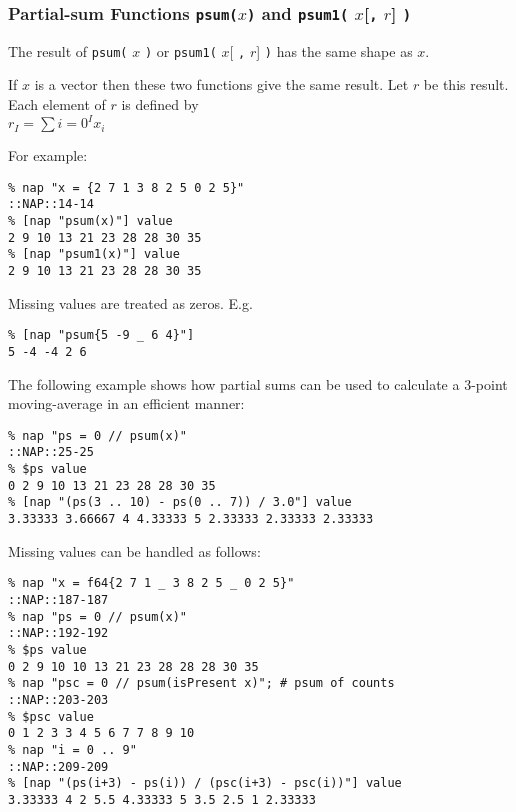   \subsubsection{
    \label{psum}Partial-sum Functions \texttt{psum(}$x$\texttt{)} and \texttt{psum1(} $x$[\texttt{,} $r$] \texttt{)}
  }
The result of 
  \texttt{psum(} 
  $x$ 
  \texttt{)} or 
  \texttt{psum1(} 
  $x$[
  \texttt{,} 
  $r$] 
  \texttt{)} has the same shape as 
  $x$.
  \par If 
  $x$ is a vector then these two functions give the same
  result. Let 
  $r$ be this result. Each element of 
  $r$ is defined by
  \\
  $r_I = \sum{i=0}^I x_i$
    \\
  \par For example:
  \begin{verbatim}
% nap "x = {2 7 1 3 8 2 5 0 2 5}"
::NAP::14-14
% [nap "psum(x)"] value
2 9 10 13 21 23 28 28 30 35
% [nap "psum1(x)"] value
2 9 10 13 21 23 28 28 30 35
\end{verbatim}

  \par Missing values are treated as zeros. E.g.
  \begin{verbatim}
% [nap "psum{5 -9 _ 6 4}"]
5 -4 -4 2 6
\end{verbatim}

  \par The following example shows how partial sums can be used to
  calculate a 3-point moving-average in an efficient manner:
  \begin{verbatim}
% nap "ps = 0 // psum(x)"
::NAP::25-25
% $ps value
0 2 9 10 13 21 23 28 28 30 35
% [nap "(ps(3 .. 10) - ps(0 .. 7)) / 3.0"] value
3.33333 3.66667 4 4.33333 5 2.33333 2.33333 2.33333
\end{verbatim}

  \par Missing values can be handled as follows:
  \begin{verbatim}
% nap "x = f64{2 7 1 _ 3 8 2 5 _ 0 2 5}"
::NAP::187-187
% nap "ps = 0 // psum(x)"
::NAP::192-192
% $ps value
0 2 9 10 10 13 21 23 28 28 28 30 35
% nap "psc = 0 // psum(isPresent x)"; # psum of counts
::NAP::203-203
% $psc value
0 1 2 3 3 4 5 6 7 7 8 9 10
% nap "i = 0 .. 9"
::NAP::209-209
% [nap "(ps(i+3) - ps(i)) / (psc(i+3) - psc(i))"] value
3.33333 4 2 5.5 4.33333 5 3.5 2.5 1 2.33333
\end{verbatim}

